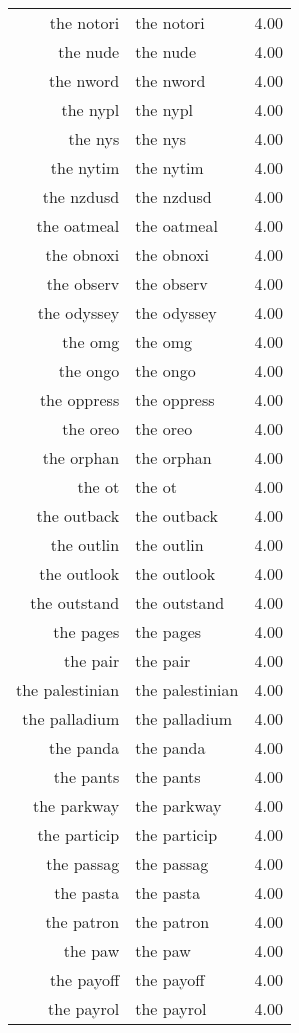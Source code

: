 \begin{table}[ht]
\begin{tabular}{rlr}
  the notori & the notori & 4.00 \\ 
  the nude & the nude & 4.00 \\ 
  the nword & the nword & 4.00 \\ 
  the nypl & the nypl & 4.00 \\ 
  the nys & the nys & 4.00 \\ 
  the nytim & the nytim & 4.00 \\ 
  the nzdusd & the nzdusd & 4.00 \\ 
  the oatmeal & the oatmeal & 4.00 \\ 
  the obnoxi & the obnoxi & 4.00 \\ 
  the observ & the observ & 4.00 \\ 
  the odyssey & the odyssey & 4.00 \\ 
  the omg & the omg & 4.00 \\ 
  the ongo & the ongo & 4.00 \\ 
  the oppress & the oppress & 4.00 \\ 
  the oreo & the oreo & 4.00 \\ 
  the orphan & the orphan & 4.00 \\ 
  the ot & the ot & 4.00 \\ 
  the outback & the outback & 4.00 \\ 
  the outlin & the outlin & 4.00 \\ 
  the outlook & the outlook & 4.00 \\ 
  the outstand & the outstand & 4.00 \\ 
  the pages & the pages & 4.00 \\ 
  the pair & the pair & 4.00 \\ 
  the palestinian & the palestinian & 4.00 \\ 
  the palladium & the palladium & 4.00 \\ 
  the panda & the panda & 4.00 \\ 
  the pants & the pants & 4.00 \\ 
  the parkway & the parkway & 4.00 \\ 
  the particip & the particip & 4.00 \\ 
  the passag & the passag & 4.00 \\ 
  the pasta & the pasta & 4.00 \\ 
  the patron & the patron & 4.00 \\ 
  the paw & the paw & 4.00 \\ 
  the payoff & the payoff & 4.00 \\ 
  the payrol & the payrol & 4.00 \\ 

\end{tabular}
\end{table}
